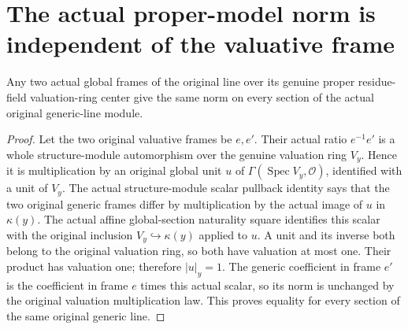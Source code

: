 \section{The actual proper-model norm is independent of the valuative frame}

\begin{lemma}
\label{lem:scheme-line-actual-model-norm-frame-independent}
\leanok
{}
Any two actual global frames of the original line over its genuine
proper residue-field valuation-ring center give the same norm on
every section of the actual original generic-line module.
\end{lemma}
\begin{proof}
Let the two original valuative frames be $e,e'$. Their actual ratio
$e^{-1}e'$ is a whole structure-module automorphism over the genuine
valuation ring $V_y$. Hence it is multiplication by an original global
unit $u$ of $\Gamma(\operatorname{Spec}V_y,\mathcal O)$, identified
with a unit of $V_y$. The actual structure-module scalar pullback
identity says that the two original generic frames differ by
multiplication by the actual image of $u$ in $\kappa(y)$. The actual
affine global-section naturality square identifies this scalar with
the original inclusion $V_y\hookrightarrow\kappa(y)$ applied to $u$.
A unit and its inverse both belong to the original valuation ring,
so both have valuation at most one. Their product has valuation one;
therefore $|u|_y=1$. The generic coefficient in frame $e'$ is the
coefficient in frame $e$ times this actual scalar, so its norm is
unchanged by the original valuation multiplication law. This proves
equality for every section of the same original generic line.
\end{proof}


